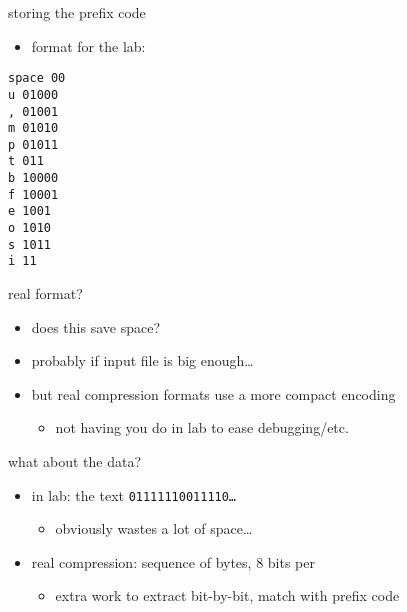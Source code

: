 \begin{frame}[fragile,label=storeCode]{storing the prefix code}
    \begin{itemize}
    \item format for the lab:
    \end{itemize}
\begin{Verbatim}[fontsize=\fontsize{10}{11}\selectfont]
space 00
u 01000
, 01001
m 01010
p 01011
t 011
b 10000
f 10001
e 1001
o 1010
s 1011
i 11
\end{Verbatim}
\end{frame}

\begin{frame}{real format?}
    \begin{itemize}
    \item does this save space?
    \item probably if input file is big enough\ldots
    \vspace{.5cm}
    \item but real compression formats use a more compact encoding
        \begin{itemize}
        \item not having you do in lab to ease debugging/etc.
        \end{itemize}
    \end{itemize}
\end{frame}

\begin{frame}{what about the data?}
    \begin{itemize}
        \item in lab: the text \texttt{01111110011110\ldots} 
            \begin{itemize}
            \item obviously wastes a lot of space\ldots
            \end{itemize}
        \item real compression: sequence of bytes, 8 bits per
            \begin{itemize}
            \item extra work to extract bit-by-bit, match with prefix code
            \end{itemize}
    \end{itemize}
\end{frame}
